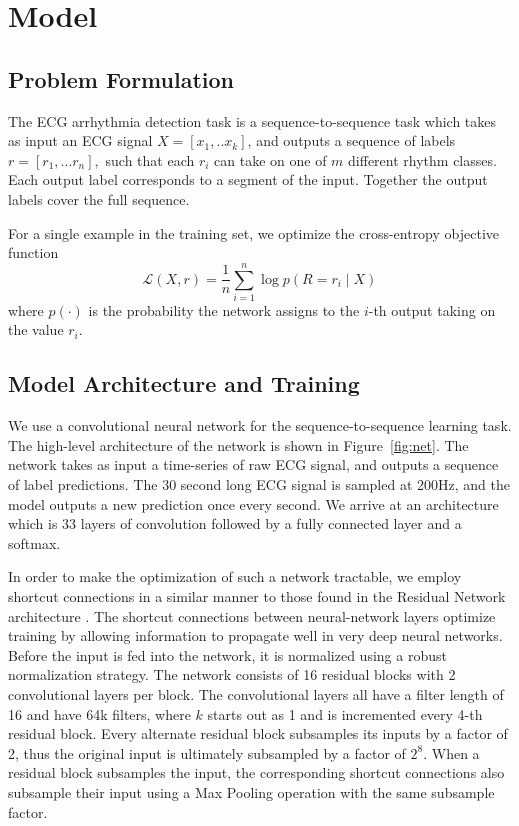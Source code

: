 \section{Model}
\label{sec:arrhythmia:model}

\subsection*{Problem Formulation}
The ECG arrhythmia detection task is a sequence-to-sequence task which takes as
input an ECG signal $X=[x_1,.. x_k]$, and outputs a sequence of labels $r=[r_1,
... r_n],$ such that each $r_i$ can take on one of $m$ different rhythm
classes. Each output label corresponds to a segment of the input. Together the
output labels cover the full sequence.

For a single example in the training set, we optimize the cross-entropy
objective function
\[
 \mathcal{L}(X, r) = \frac{1}{n} \sum_{i=1}^n \log p(R = r_i \mid X)
\]
where $p(\cdot)$ is the probability the network assigns to the $i$-th output
taking on the value $r_i$.

\subsection*{Model Architecture and Training}
We use a convolutional neural network for the sequence-to-sequence learning
task. The high-level architecture of the network is shown in
Figure~\ref{fig:net}. The network takes as input a time-series of raw ECG
signal, and outputs a sequence of label predictions. The 30 second long ECG
signal is sampled at 200Hz, and the model outputs a new prediction once every
second. We arrive at an architecture which is 33 layers of convolution followed
by a fully connected layer and a softmax. 

In order to make the optimization of such a network tractable, we employ
shortcut connections in a similar manner to those found in the Residual Network
architecture \cite{he2016identity}. The shortcut connections between
neural-network layers optimize training by allowing information to propagate
well in very deep neural networks. Before the input is fed into the network, it
is normalized using a robust normalization strategy. The network consists of
16 residual blocks with 2 convolutional layers per block. The convolutional
layers all have a filter length of 16 and have 64k filters, where $k$
starts out as 1 and is incremented every 4-th residual block. Every
alternate residual block subsamples its inputs by a factor of 2, thus the
original input is ultimately subsampled by a factor of $2^8$. When a residual
block subsamples the input, the corresponding shortcut connections also
subsample their input using a Max Pooling operation with the same subsample
factor. 

